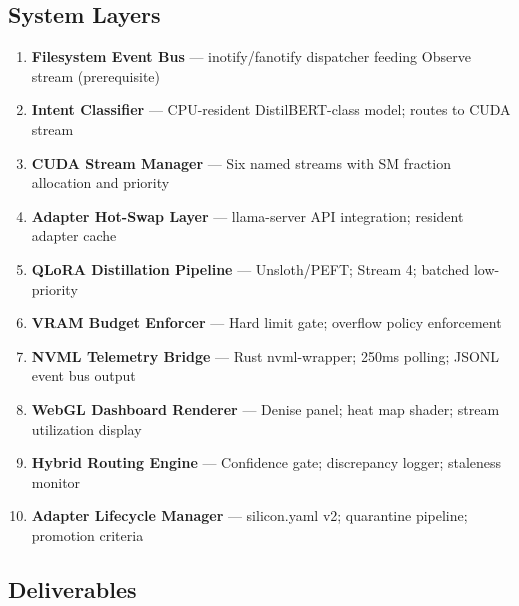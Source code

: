 \documentclass[11pt,letterpaper]{article}
\begin{document}
\subsection{System Layers}

\begin{enumerate}[leftmargin=*, label=\textbf{L\arabic*.}]
  \item \textbf{Filesystem Event Bus} --- inotify/fanotify dispatcher feeding Observe stream (prerequisite)
  \item \textbf{Intent Classifier} --- CPU-resident DistilBERT-class model; routes to CUDA stream
  \item \textbf{CUDA Stream Manager} --- Six named streams with SM fraction allocation and priority
  \item \textbf{Adapter Hot-Swap Layer} --- llama-server API integration; resident adapter cache
  \item \textbf{QLoRA Distillation Pipeline} --- Unsloth/PEFT; Stream 4; batched low-priority
  \item \textbf{VRAM Budget Enforcer} --- Hard limit gate; overflow policy enforcement
  \item \textbf{NVML Telemetry Bridge} --- Rust nvml-wrapper; 250ms polling; JSONL event bus output
  \item \textbf{WebGL Dashboard Renderer} --- Denise panel; heat map shader; stream utilization display
  \item \textbf{Hybrid Routing Engine} --- Confidence gate; discrepancy logger; staleness monitor
  \item \textbf{Adapter Lifecycle Manager} --- silicon.yaml v2; quarantine pipeline; promotion criteria
\end{enumerate}

\subsection{Deliverables}
\end{document}
